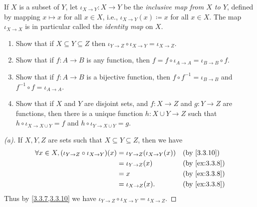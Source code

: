 \begin{ex}\label{ex:3.3.8}
  If \(X\) is a subset of \(Y\), let \(\iota_{X \to Y} : X \to Y\) be the \emph{inclusive map from \(X\) to \(Y\)}, defined by mapping \(x \mapsto x\) for all \(x \in X\), i.e., \(\iota_{X \to Y}(x) \coloneqq x\) for all \(x \in X\).
  The map \(\iota_{X \to X}\) is in particular called the \emph{identity map} on \(X\).
  \begin{enumerate}
    \item Show that if \(X \subseteq Y \subseteq Z\) then \(\iota_{Y \to Z} \circ \iota_{X \to Y} = \iota_{X \to Z}\).
    \item Show that if \(f : A \to B\) is any function, then \(f = f \circ \iota_{A \to A} = \iota_{B \to B} \circ f\).
    \item Show that if \(f : A \to B\) is a bijective function, then \(f \circ f^{-1} = \iota_{B \to B}\) and \(f^{-1} \circ f = \iota_{A \to A}\).
    \item Show that if \(X\) and \(Y\) are disjoint sets, and \(f : X \to Z\) and \(g : Y \to Z\) are functions, then there is a unique function \(h : X \cup Y \to Z\) such that \(h \circ \iota_{X \to X \cup Y} = f\) and \(h \circ \iota_{Y \to X \cup Y} = g\).
  \end{enumerate}
\end{ex}

\begin{proof}[(a)]
  If \(X, Y, Z\) are sets such that \(X \subseteq Y \subseteq Z\), then we have
  \begin{align*}
    \forall x \in X, (\iota_{Y \to Z} \circ \iota_{X \to Y})(x) & = \iota_{Y \to Z}(\iota_{X \to Y}(x)) &  & \by{3.3.10}   \\
                                                                & = \iota_{Y \to Z}(x)                  &  & \by{ex:3.3.8} \\
                                                                & = x                                   &  & \by{ex:3.3.8} \\
                                                                & = \iota_{X \to Z}(x).                 &  & \by{ex:3.3.8}
  \end{align*}
  Thus by \cref{3.3.7,3.3.10} we have \(\iota_{Y \to Z} \circ \iota_{X \to Y} = \iota_{X \to Z}\).
\end{proof}

